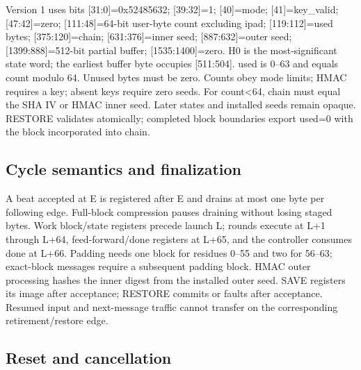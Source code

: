 \documentclass[11pt,a4paper]{article}
\begin{document}
Version 1 uses bits [\allowbreak{}31:0]\allowbreak{}=\allowbreak{}0x52485632; [\allowbreak{}39:32]\allowbreak{}=\allowbreak{}1; [\allowbreak{}40]\allowbreak{}=\allowbreak{}mode; [\allowbreak{}41]\allowbreak{}=\allowbreak{}key\_\allowbreak{}valid; [\allowbreak{}47:42]\allowbreak{}=\allowbreak{}zero; [\allowbreak{}111:48]\allowbreak{}=\allowbreak{}64-bit user-byte count excluding ipad; [\allowbreak{}119:112]\allowbreak{}=\allowbreak{}used bytes; [\allowbreak{}375:120]\allowbreak{}=\allowbreak{}chain; [\allowbreak{}631:376]\allowbreak{}=\allowbreak{}inner seed; [\allowbreak{}887:632]\allowbreak{}=\allowbreak{}outer seed; [\allowbreak{}1399:888]\allowbreak{}=\allowbreak{}512-bit partial buffer; [\allowbreak{}1535:1400]\allowbreak{}=\allowbreak{}zero. H0 is the most-significant state word; the earliest buffer byte occupies [\allowbreak{}511:504]\allowbreak{}. used is 0–63 and equals count modulo 64. Unused bytes must be zero. Counts obey mode limits; HMAC requires a key; absent keys require zero seeds. For count<64,\allowbreak{} chain must equal the SHA IV or HMAC inner seed. Later states and installed seeds remain opaque. RESTORE validates atomically; completed block boundaries export used=\allowbreak{}0 with the block incorporated into chain.

\subsection{Cycle semantics and finalization}

A beat accepted at E is registered after E and drains at most one byte per following edge. Full-block compression pauses draining without losing staged bytes. Work block/\allowbreak{}state registers precede launch L; rounds execute at L+\allowbreak{}1 through L+\allowbreak{}64,\allowbreak{} feed-forward/\allowbreak{}done registers at L+\allowbreak{}65,\allowbreak{} and the controller consumes done at L+\allowbreak{}66. Padding needs one block for residues 0–55 and two for 56–63; exact-block messages require a subsequent padding block. HMAC outer processing hashes the inner digest from the installed outer seed. SAVE registers its image after acceptance; RESTORE commits or faults after acceptance. Resumed input and next-message traffic cannot transfer on the corresponding retirement/\allowbreak{}restore edge.

\subsection{Reset and cancellation}
\end{document}
